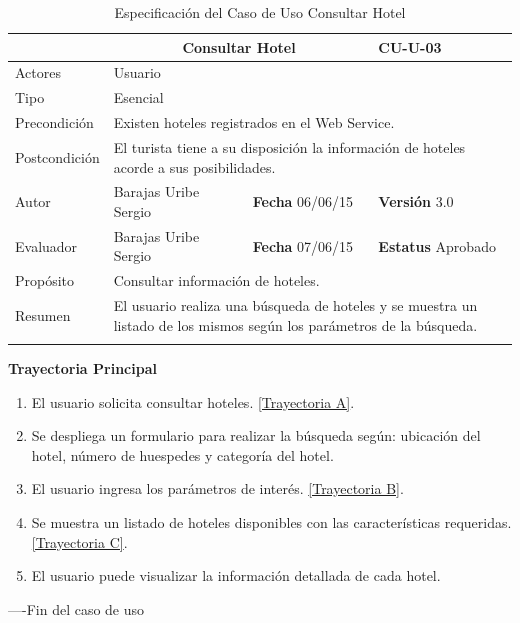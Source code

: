 \begin{longtable}{|p{2.5cm}|p{6.4cm}|p{2cm}|p{2cm}|}
	\hline
		\rowcolor[RGB]{51,153,255}{Caso de Uso}&\multicolumn{2}{c}{Consultar Hotel}&{\textbf{CU-U-03}}\\
	\hline
		{Actores}&\multicolumn{3}{p{11.2cm}|}{Usuario}\\
	\hline
		{Tipo}&\multicolumn{3}{p{11.2cm}|}{Esencial}\\
	\hline
		{Precondición}&\multicolumn{3}{p{11.2cm}|}{	Existen hoteles registrados en el Web Service.}\\
	\hline
		{Postcondición}&\multicolumn{3}{p{11.2cm}|}{El turista tiene a su disposición la información de hoteles acorde a sus posibilidades.}\\
	\hline
		{Autor}&{Barajas Uribe Sergio}&{\textbf{Fecha} 06/06/15}&{\textbf{Versión} 3.0}\\
			\hline
		{Evaluador}&{Barajas Uribe Sergio}&{\textbf{Fecha} 07/06/15}&{\textbf{Estatus} Aprobado}\\
	\hline
		{Propósito}&\multicolumn{3}{p{11.2cm}|}{Consultar información de hoteles.}\\
	\hline
		{Resumen}&\multicolumn{3}{p{11.2cm}|}{El usuario realiza una búsqueda de hoteles y se muestra un listado de los mismos según los parámetros de la búsqueda. }\\	
	\hline
	\caption[Especificación del Caso de Uso Consultar Hotel]{Especificación del Caso de Uso Consultar Hotel}
    	\label{tab:cuConsultarHotel}
\end{longtable}

\begin{flushleft}
	\textbf{Trayectoria Principal}\\
	\begin{enumerate}
		\item El usuario solicita consultar hoteles. \hyperlink{TrayectoriaA_CU-U-03}{[Trayectoria A]}.
		\item Se despliega un formulario para realizar la búsqueda según: ubicación del hotel, número de huespedes 
		y categoría del hotel.
		\item El usuario ingresa los parámetros de interés. \hyperlink{TrayectoriaB_CU-U-03}{[Trayectoria B]}.
		\item Se  muestra un listado de hoteles disponibles con las características requeridas. \hyperlink{TrayectoriaC_CU-U-03}{[Trayectoria C]}.
		\item El usuario puede visualizar la información detallada de cada hotel.
	\end{enumerate}
\end{flushleft}
----Fin del caso de uso

